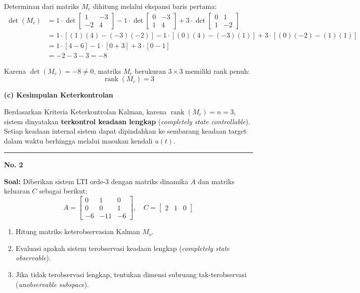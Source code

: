 \documentclass[11pt,a4paper]{article}
\begin{document}
Determinan dari matriks $M_c$ dihitung melalui ekspansi baris pertama:
\begin{align*}
    \det(M_c) &= 1 \cdot \det \begin{bmatrix} 1 & -3 \\ -2 & 4 \end{bmatrix} - 1 \cdot \det \begin{bmatrix} 0 & -3 \\ 1 & 4 \end{bmatrix} + 3 \cdot \det \begin{bmatrix} 0 & 1 \\ 1 & -2 \end{bmatrix} \\
    &= 1 \cdot [(1)(4) - (-3)(-2)] - 1 \cdot [(0)(4) - (-3)(1)] + 3 \cdot [(0)(-2) - (1)(1)] \\
    &= 1 \cdot [4 - 6] - 1 \cdot [0 + 3] + 3 \cdot [0 - 1] \\
    &= -2 - 3 - 3 = -8
\end{align*}

Karena $\det(M_c) = -8 \ne 0$, matriks $M_c$ berukuran $3 \times 3$ memiliki rank penuh:
$$\operatorname{rank}(M_c) = 3$$

\textbf{(c) Kesimpulan Keterkontrolan}

Berdasarkan Kriteria Keterkontrolan Kalman, karena $\operatorname{rank}(M_c) = n = 3$, sistem dinyatakan \textbf{terkontrol keadaan lengkap} (\textit{completely state controllable}). Setiap keadaan internal sistem dapat dipindahkan ke sembarang keadaan target dalam waktu berhingga melalui masukan kendali $u(t)$.

\vspace{12pt}
\hrule
\vspace{10pt}

\textbf{\large No. 2}

\textbf{Soal:}  
Diberikan sistem LTI orde-3 dengan matriks dinamika $A$ dan matriks keluaran $C$ sebagai berikut:
$$A = \begin{bmatrix} 0 & 1 & 0 \\ 0 & 0 & 1 \\ -6 & -11 & -6 \end{bmatrix}, \quad C = \begin{bmatrix} 2 & 1 & 0 \end{bmatrix}$$
\begin{enumerate}[label=(\alph*)]
    \item Hitung matriks keterobservasian Kalman $M_o$.
    \item Evaluasi apakah sistem terobservasi keadaan lengkap (\textit{completely state observable}).
    \item Jika tidak terobservasi lengkap, tentukan dimensi subruang tak-terobservasi (\textit{unobservable subspace}).
\end{enumerate}
\end{document}
